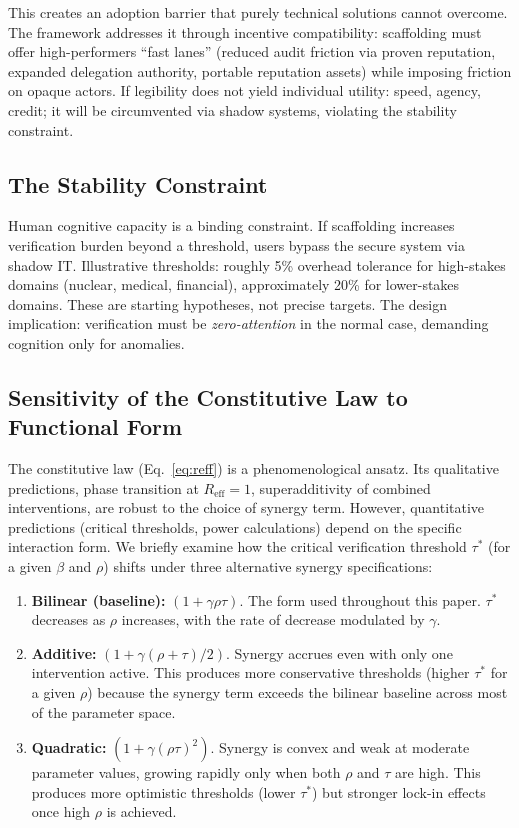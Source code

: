 \documentclass[runningheads]{llncs}
\begin{document}
This creates an adoption barrier that purely technical solutions cannot overcome. The framework addresses it through incentive compatibility: scaffolding must offer high-performers ``fast lanes'' (reduced audit friction via proven reputation, expanded delegation authority, portable reputation assets) while imposing friction on opaque actors. If legibility does not yield individual utility: speed, agency, credit; it will be circumvented via shadow systems, violating the stability constraint.

\subsection{The Stability Constraint}

Human cognitive capacity is a binding constraint. If scaffolding increases verification burden beyond a threshold, users bypass the secure system via shadow IT. Illustrative thresholds: roughly 5\% overhead tolerance for high-stakes domains (nuclear, medical, financial), approximately 20\% for lower-stakes domains. These are starting hypotheses, not precise targets. The design implication: verification must be \emph{zero-attention} in the normal case, demanding cognition only for anomalies.

\subsection{Sensitivity of the Constitutive Law to Functional Form}
\label{sec:sensitivity}

The constitutive law (Eq.~\ref{eq:reff}) is a phenomenological ansatz. Its qualitative predictions, phase transition at $R_{\mathrm{eff}} = 1$, superadditivity of combined interventions, are robust to the choice of synergy term. However, quantitative predictions (critical thresholds, power calculations) depend on the specific interaction form. We briefly examine how the critical verification threshold $\tau^*$ (for a given $\beta$ and $\rho$) shifts under three alternative synergy specifications:

\begin{enumerate}
\item \textbf{Bilinear (baseline):} $(1+\gamma\rho\tau)$. The form used throughout this paper. $\tau^*$ decreases as $\rho$ increases, with the rate of decrease modulated by $\gamma$.
\item \textbf{Additive:} $(1+\gamma(\rho+\tau)/2)$. Synergy accrues even with only one intervention active. This produces more conservative thresholds (higher $\tau^*$ for a given $\rho$) because the synergy term exceeds the bilinear baseline across most of the parameter space.
\item \textbf{Quadratic:} $(1+\gamma(\rho\tau)^2)$. Synergy is convex and weak at moderate parameter values, growing rapidly only when both $\rho$ and $\tau$ are high. This produces more optimistic thresholds (lower $\tau^*$) but stronger lock-in effects once high $\rho$ is achieved.
\end{enumerate}
\end{document}
